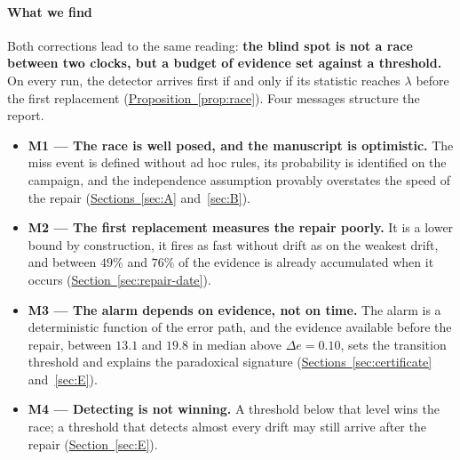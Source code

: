\documentclass[10pt,conference]{IEEEtran}
\theoremstyle{definition}
\begin{document}
\paragraph*{What we find} Both corrections lead to the same reading: \textbf{the blind
spot is not a race between two clocks, but a budget of evidence set against a threshold.}
On every run, the detector arrives first if and only if its statistic reaches $\lambda$
before the first replacement (\hyperref[prop:race]{Proposition~\ref*{prop:race}}). Four messages structure the
report.
\begin{itemize}
  \item \textbf{M1 --- The race is well posed, and the manuscript is optimistic.} The miss
    event is defined without ad hoc rules, its probability is identified on the campaign,
    and the independence assumption provably overstates the speed of the repair
    (\hyperref[sec:A]{Sections~\ref*{sec:A}} and~\ref{sec:B}).
  \item \textbf{M2 --- The first replacement measures the repair poorly.} It is a lower
    bound by construction, it fires as fast without drift as on the weakest drift, and between
    $49\%$ and $76\%$ of the evidence is already accumulated when it occurs
    (\hyperref[sec:repair-date]{Section~\ref*{sec:repair-date}}).
  \item \textbf{M3 --- The alarm depends on evidence, not on time.} The alarm is a
    deterministic function of the error path, and the evidence available before the repair,
    between $13.1$ and $19.8$ in median above $\Delta e = 0.10$, sets the transition
    threshold and explains the paradoxical signature (\hyperref[sec:certificate]{Sections~\ref*{sec:certificate}}
    and~\ref{sec:E}).
  \item \textbf{M4 --- Detecting is not winning.} A threshold below that level wins the race;
    a threshold that detects almost every drift may still arrive after the repair
    (\hyperref[sec:E]{Section~\ref*{sec:E}}).
\end{itemize}
\end{document}
